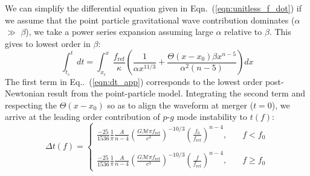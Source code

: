 We can simplify the differential equation given in Eqn.~(\ref{eqn:unitless_f_dot}) if we assume that the point particle gravitational wave contribution dominates ($\alpha$ $\gg$ $\beta$), we take a power series expansion assuming large $\alpha$ relative to $\beta$. This gives to lowest order in $\beta$:
\begin{equation}\label{eqn:dt_app}
\int_{t_c}^t dt = \int_{x_c}^{x} \frac{f_{\mathrm{ref}}}{\kappa} \left (\frac{1}{\alpha x^{11/3}} +  \frac{\Theta(x - x_0) \beta x^{n-5}}{\alpha^2 (n-5)} \right ) dx
\end{equation}
The first term in Eq..~(\ref{eqn:dt_app}) corresponds to the lowest order post-Newtonian result from the point-particle model. Integrating the second term and respecting the $\Theta(x-x_0)$ so as to align the waveform at merger ($t=0$), we arrive at the leading order contribution of $p$-$g$ mode instability to $t(f)$:
\begin{equation}\label{eqn:t_of_f_app}
\Delta t(f) = \left \{
              \begin{array}{ll}
              \frac{-25}{1536} \frac{1}{\pi} \frac{A}{n-4} \left ( \frac{G \mathcal{M} \pi f_{\mathrm{ref}}}{c^3} \right )^{-10/3}\left ( \frac{f_0}{f_{\mathrm{ref}}} \right )^{n-4}, &\quad   f < f_0 \\ \\
              \frac{-25}{1536} \frac{1}{\pi} \frac{A}{n-4} \left ( \frac{G \mathcal{M} \pi f_{\mathrm{ref}}}{c^3} \right )^{-10/3}\left ( \frac{f}{f_{\mathrm{ref}}} \right )^{n-4}, &\quad  f \ge f_0
              \end{array}
              \right.
\end{equation}

